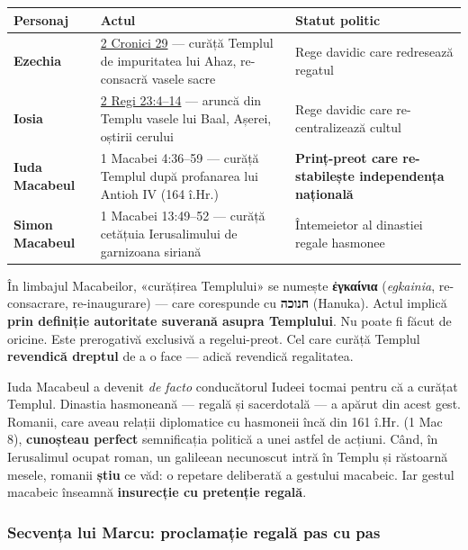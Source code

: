 \documentclass[12pt,a4paper,twoside,openany]{book}
\begin{document}
\begin{center}
\small
\begin{tabularx}{\textwidth}{L{3.2cm}L{5.5cm}X}
\toprule
{}
\textbf{Personaj} & \textbf{Actul} & \textbf{Statut politic} \\
\midrule
\textbf{Ezechia} & \href{https://bibliaortodoxa.ro/carte.php?id=14\&cap=29\#3}{2 Cronici 29} — curăță Templul de impuritatea lui Ahaz, re-consacră vasele sacre & Rege davidic care redresează regatul \\
\textbf{Iosia} & \href{https://bibliaortodoxa.ro/carte.php?id=12\&cap=23\#4}{2 Regi 23:4--14} — aruncă din Templu vasele lui Baal, Așerei, oștirii cerului & Rege davidic care re-centralizează cultul \\
\textbf{Iuda Macabeul} & 1 Macabei 4:36--59 — curăță Templul după profanarea lui Antioh IV (164 î.Hr.) & \textbf{Prinț-preot care re-stabilește independența națională} \\
\textbf{Simon Macabeul} & 1 Macabei 13:49--52 — curăță cetățuia Ierusalimului de garnizoana siriană & Întemeietor al dinastiei regale hasmonee \\
\bottomrule
\end{tabularx}
\end{center}

În limbajul Macabeilor, «curățirea Templului» se numește \textbf{ἐγκαίνια} (\textit{egkainia}, re-consacrare, re-inaugurare) — care corespunde cu \textbf{חנוכה} (Hanuka). Actul implică \textbf{prin definiție autoritate suverană asupra Templului}. Nu poate fi făcut de oricine. Este prerogativă exclusivă a regelui-preot. Cel care curăță Templul \textbf{revendică dreptul} de a o face — adică revendică regalitatea.

Iuda Macabeul a devenit \textit{de facto} conducătorul Iudeei tocmai pentru că a curățat Templul. Dinastia hasmoneană — regală și sacerdotală — a apărut din acest gest. Romanii, care aveau relații diplomatice cu hasmoneii încă din 161 î.Hr. (1 Mac 8), \textbf{cunoșteau perfect} semnificația politică a unei astfel de acțiuni. Când, în Ierusalimul ocupat roman, un galileean necunoscut intră în Templu și răstoarnă mesele, romanii \textbf{știu} ce văd: o repetare deliberată a gestului macabeic. Iar gestul macabeic înseamnă \textbf{insurecție cu pretenție regală}.

\subsubsection*{Secvența lui Marcu: proclamație regală pas cu pas}
\end{document}
